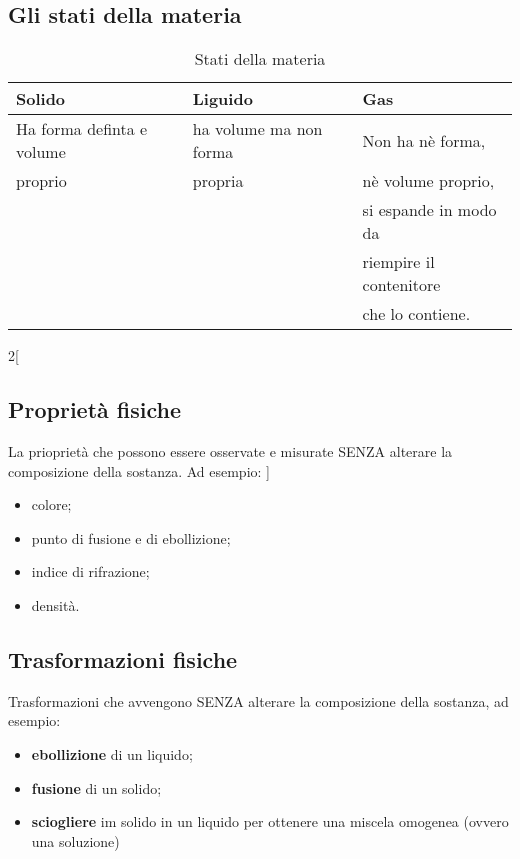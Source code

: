 \subsection{Gli stati della materia}
\label{sec:statidellamateria}

\begin{table}[ht!]
  \centering
  \begin{tabular}{lll}
    {\color{red}Solido}&{\color{blue}Liguido}&{\color{green}Gas}\\\hline
    Ha forma definta e volume & ha volume ma non forma & Non ha nè forma,\\
    proprio &  propria & nè volume proprio,\\
                       &&si espande in modo da\\
                       && riempire il contenitore\\
                       &&che lo contiene.\\\hline
  \end{tabular}
  \caption{Stati della materia}
  \label{tab:glistatidellamateria}
\end{table}

\begin{multicols}{2}[
  \subsection{Proprietà fisiche}
  \label{sec:propfisiche}
  La prioprietà che possono essere osservate e misurate {\color{red} SENZA} alterare la composizione della sostanza.
  Ad esempio:
  ]
  \begin{itemize}
\item colore;
\item punto di fusione e di ebollizione;
\item indice di rifrazione;
\item densità.
\end{itemize}
\end{multicols}
\subsection{Trasformazioni fisiche}
\label{sec:trasfisiche}
Trasformazioni che avvengono {\color{red} SENZA} alterare la composizione della sostanza, ad esempio:
\begin{itemize}
\item \textbf{ebollizione} di un liquido;
\item \textbf{fusione} di un solido;
\item \textbf{sciogliere} im solido in un liquido per ottenere una miscela omogenea (ovvero una
  {\color{blue}soluzione})
\end{itemize}

